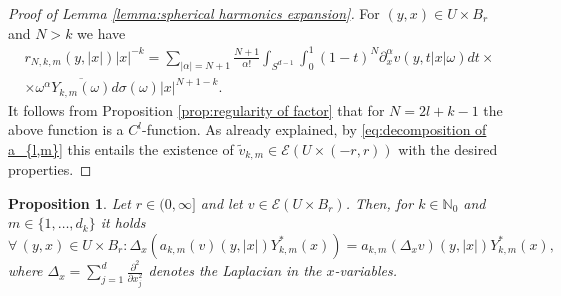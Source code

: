 \documentclass[a4paper,10pt]{amsart}
\newtheorem{proposition}[theorem]{Proposition}
\newtheorem*{crucial lemma}{Lemma \ref{lem:nice polynomial2}}
\theoremstyle{definition}
\newcommand{\N}{\mathbb{N}}
\begin{document}
\begin{proof}[Proof of Lemma \ref{lemma:spherical harmonics expansion}]
	For $(y,x)\in U\times B_r$ and $N>k$ we have
	\begin{gather*}
		r_{N,k,m}(y,|x|)|x|^{-k}=\sum_{|\alpha|=N+1}\frac{N+1}{\alpha!} \int_{S^{d-1}} \int_0^1 (1-t)^N \partial_x^\alpha v(y,t|x|\omega)dt\times \\ \times \omega^\alpha \overline{Y_{k,m}(\omega)} d\sigma(\omega)|x|^{N+1-k}.
	\end{gather*}
	It follows from Proposition \ref{prop:regularity of factor} that for $N=2l+k-1$ the above function is a $C^l$-function. As already explained, by \eqref{eq:decomposition of a_{l,m}} this entails the existence of $\tilde{v}_{k,m}\in \mathscr{E}(U\times (-r,r))$ with the desired properties.	
\end{proof}

\begin{proposition}\label{prop:cofficients commute with Laplace}
	Let $r\in(0,\infty]$ and let $v\in\mathscr{E}(U\times B_r)$.  Then, for $k\in\N_0$ and $m\in\{1,\ldots,d_k\}$ it holds
	\[\forall\,(y,x)\in U\times B_r\colon \Delta_x\left(a_{k,m}(v)(y,|x|)Y^*_{k,m}(x)\right)=a_{k,m}\left(\Delta_x v\right)(y,|x|)Y^*_{k,m}(x),\]
	where $\Delta_x=\sum_{j=1}^d\frac{\partial^2}{\partial x_j^2}$ denotes the Laplacian in the $x$-variables.
\end{proposition}
\end{document}
